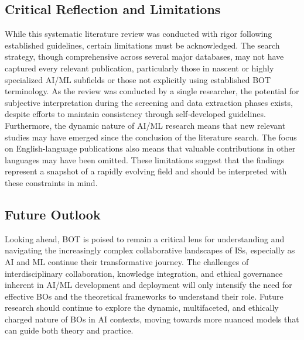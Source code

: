 \documentclass[12pt,oneside]{article}
\begin{document}
\subsection{Critical Reflection and Limitations} \label{critical-reflection-and-limitations}

While this systematic literature review was conducted with rigor following established guidelines, certain limitations must be acknowledged. The search strategy, though comprehensive across several major databases, may not have captured every relevant publication, particularly those in nascent or highly specialized \ac{AI}/\ac{ML} subfields or those not explicitly using established \ac{BOT} terminology. As the review was conducted by a single researcher, the potential for subjective interpretation during the screening and data extraction phases exists, despite efforts to maintain consistency through self-developed guidelines. Furthermore, the dynamic nature of \ac{AI}/\ac{ML} research means that new relevant studies may have emerged since the conclusion of the literature search. The focus on English-language publications also means that valuable contributions in other languages may have been omitted. These limitations suggest that the findings represent a snapshot of a rapidly evolving field and should be interpreted with these constraints in mind.

\subsection{Future Outlook} \label{future-outlook}

Looking ahead, \ac{BOT} is poised to remain a critical lens for understanding and navigating the increasingly complex collaborative landscapes of \ac{IS}s, especially as \ac{AI} and \ac{ML} continue their transformative journey. The challenges of interdisciplinary collaboration, knowledge integration, and ethical governance inherent in \ac{AI}/\ac{ML} development and deployment will only intensify the need for effective \ac{BO}s and the theoretical frameworks to understand their role. Future research should continue to explore the dynamic, multifaceted, and ethically charged nature of \ac{BO}s in \ac{AI} contexts, moving towards more nuanced models that can guide both theory and practice.

\clearpage
\lhead{}
\printbibliography
{}




\end{document}
